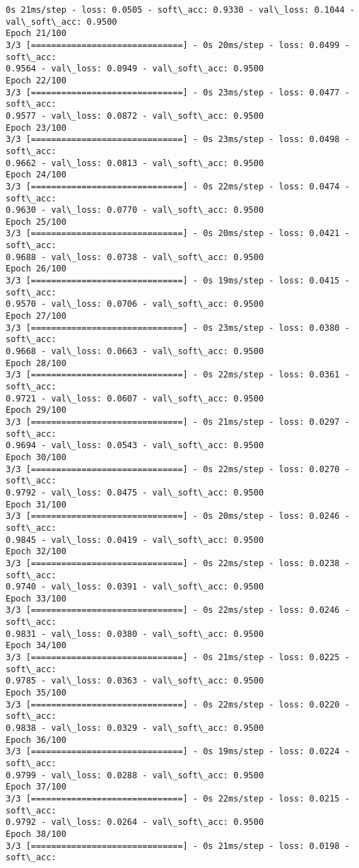 \documentclass[11pt]{article}
\begin{document}
\begin{Verbatim}[commandchars=\\\{\}]
0s 21ms/step - loss: 0.0505 - soft\_acc: 0.9330 - val\_loss: 0.1044 -
val\_soft\_acc: 0.9500
Epoch 21/100
3/3 [==============================] - 0s 20ms/step - loss: 0.0499 - soft\_acc:
0.9564 - val\_loss: 0.0949 - val\_soft\_acc: 0.9500
Epoch 22/100
3/3 [==============================] - 0s 23ms/step - loss: 0.0477 - soft\_acc:
0.9577 - val\_loss: 0.0872 - val\_soft\_acc: 0.9500
Epoch 23/100
3/3 [==============================] - 0s 23ms/step - loss: 0.0498 - soft\_acc:
0.9662 - val\_loss: 0.0813 - val\_soft\_acc: 0.9500
Epoch 24/100
3/3 [==============================] - 0s 22ms/step - loss: 0.0474 - soft\_acc:
0.9630 - val\_loss: 0.0770 - val\_soft\_acc: 0.9500
Epoch 25/100
3/3 [==============================] - 0s 20ms/step - loss: 0.0421 - soft\_acc:
0.9688 - val\_loss: 0.0738 - val\_soft\_acc: 0.9500
Epoch 26/100
3/3 [==============================] - 0s 19ms/step - loss: 0.0415 - soft\_acc:
0.9570 - val\_loss: 0.0706 - val\_soft\_acc: 0.9500
Epoch 27/100
3/3 [==============================] - 0s 23ms/step - loss: 0.0380 - soft\_acc:
0.9668 - val\_loss: 0.0663 - val\_soft\_acc: 0.9500
Epoch 28/100
3/3 [==============================] - 0s 22ms/step - loss: 0.0361 - soft\_acc:
0.9721 - val\_loss: 0.0607 - val\_soft\_acc: 0.9500
Epoch 29/100
3/3 [==============================] - 0s 21ms/step - loss: 0.0297 - soft\_acc:
0.9694 - val\_loss: 0.0543 - val\_soft\_acc: 0.9500
Epoch 30/100
3/3 [==============================] - 0s 22ms/step - loss: 0.0270 - soft\_acc:
0.9792 - val\_loss: 0.0475 - val\_soft\_acc: 0.9500
Epoch 31/100
3/3 [==============================] - 0s 20ms/step - loss: 0.0246 - soft\_acc:
0.9845 - val\_loss: 0.0419 - val\_soft\_acc: 0.9500
Epoch 32/100
3/3 [==============================] - 0s 22ms/step - loss: 0.0238 - soft\_acc:
0.9740 - val\_loss: 0.0391 - val\_soft\_acc: 0.9500
Epoch 33/100
3/3 [==============================] - 0s 22ms/step - loss: 0.0246 - soft\_acc:
0.9831 - val\_loss: 0.0380 - val\_soft\_acc: 0.9500
Epoch 34/100
3/3 [==============================] - 0s 21ms/step - loss: 0.0225 - soft\_acc:
0.9785 - val\_loss: 0.0363 - val\_soft\_acc: 0.9500
Epoch 35/100
3/3 [==============================] - 0s 22ms/step - loss: 0.0220 - soft\_acc:
0.9838 - val\_loss: 0.0329 - val\_soft\_acc: 0.9500
Epoch 36/100
3/3 [==============================] - 0s 19ms/step - loss: 0.0224 - soft\_acc:
0.9799 - val\_loss: 0.0288 - val\_soft\_acc: 0.9500
Epoch 37/100
3/3 [==============================] - 0s 22ms/step - loss: 0.0215 - soft\_acc:
0.9792 - val\_loss: 0.0264 - val\_soft\_acc: 0.9500
Epoch 38/100
3/3 [==============================] - 0s 21ms/step - loss: 0.0198 - soft\_acc:

\end{Verbatim}
\end{document}
